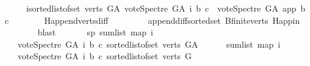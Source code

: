 \begin{isabellebody}
\ \ \ \ \ {\isacharparenleft}{\kern0pt}{\isasymSum}i{\isasymleftarrow}sorted{\isacharunderscore}{\kern0pt}list{\isacharunderscore}{\kern0pt}of{\isacharunderscore}{\kern0pt}set\ {\isacharparenleft}{\kern0pt}verts\ G{\isacharunderscore}{\kern0pt}A{\isacharparenright}{\kern0pt}{\isachardot}{\kern0pt}\ vote{\isacharunderscore}{\kern0pt}Spectre\ G{\isacharunderscore}{\kern0pt}A\ i\ b\ c{\isacharparenright}{\kern0pt}\ {\isacharminus}{\kern0pt}\ vote{\isacharunderscore}{\kern0pt}Spectre\ G{\isacharunderscore}{\kern0pt}A\ app\ b\ c{\isachardoublequoteclose}\isanewline
\ \ \ \ \ \ \isamarkupfalse%
\ H{}{\isachardot}{\kern0pt}append{\isacharunderscore}{\kern0pt}verts{\isacharunderscore}{\kern0pt}diff\ \isanewline
\ \ \ \ \ \ \isamarkupfalse%
\ append{\isacharunderscore}{\kern0pt}diff{\isacharunderscore}{\kern0pt}sorted{\isacharunderscore}{\kern0pt}set\ B{}{\isachardot}{\kern0pt}finite{\isacharunderscore}{\kern0pt}verts\ H{}{\isachardot}{\kern0pt}app{\isacharunderscore}{\kern0pt}in\ \isanewline
\ \ \ \ \ \ \isamarkupfalse%
\ blast\ \isanewline
\ \ \ \ \isamarkupfalse%
\ sp{}{\isacharcolon}{\kern0pt}\ {\isachardoublequoteopen}sum{\isacharunderscore}{\kern0pt}list\ {\isacharparenleft}{\kern0pt}map\ {\isacharparenleft}{\kern0pt}{\isasymlambda}i{\isachardot}{\kern0pt}\isanewline
\ \ \ {\isacharparenleft}{\kern0pt}vote{\isacharunderscore}{\kern0pt}Spectre\ G{\isacharunderscore}{\kern0pt}A\ i\ b\ c{\isacharparenright}{\kern0pt}{\isacharparenright}{\kern0pt}\ {\isacharparenleft}{\kern0pt}sorted{\isacharunderscore}{\kern0pt}list{\isacharunderscore}{\kern0pt}of{\isacharunderscore}{\kern0pt}set\ {\isacharparenleft}{\kern0pt}verts\ G{\isacharunderscore}{\kern0pt}A{\isacharparenright}{\kern0pt}{\isacharparenright}{\kern0pt}{\isacharparenright}{\kern0pt}\ {\isacharequal}{\kern0pt}\ \isanewline
\ \ \ \ sum{\isacharunderscore}{\kern0pt}list\ {\isacharparenleft}{\kern0pt}map\ {\isacharparenleft}{\kern0pt}{\isasymlambda}i{\isachardot}{\kern0pt}\isanewline
\ \ \ {\isacharparenleft}{\kern0pt}vote{\isacharunderscore}{\kern0pt}Spectre\ G{\isacharunderscore}{\kern0pt}A\ i\ b\ c{\isacharparenright}{\kern0pt}{\isacharparenright}{\kern0pt}\ {\isacharparenleft}{\kern0pt}sorted{\isacharunderscore}{\kern0pt}list{\isacharunderscore}{\kern0pt}of{\isacharunderscore}{\kern0pt}set\ {\isacharparenleft}{\kern0pt}verts\ G{\isacharparenright}{\kern0pt}{\isacharparenright}{\kern0pt}{\isacharparenright}{\kern0pt}\ {\isacharplus}{\kern0pt}\ {}{\isachardoublequoteclose}\ \isanewline

\end{isabellebody}
